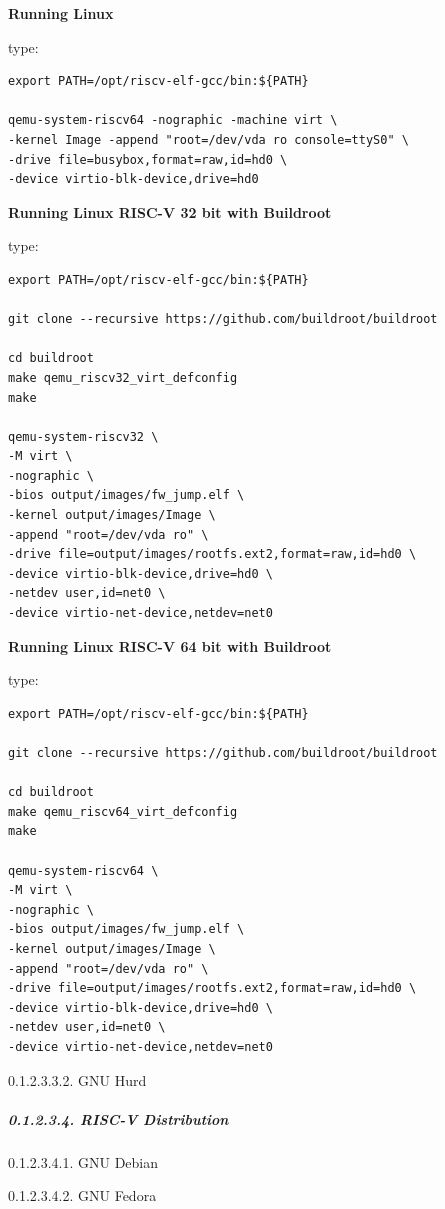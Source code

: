 \documentclass[
]{article}
\begin{document}
\textbf{Running Linux}

type:

\begin{verbatim}
export PATH=/opt/riscv-elf-gcc/bin:${PATH}

qemu-system-riscv64 -nographic -machine virt \
-kernel Image -append "root=/dev/vda ro console=ttyS0" \
-drive file=busybox,format=raw,id=hd0 \
-device virtio-blk-device,drive=hd0
\end{verbatim}

\textbf{Running Linux RISC-V 32 bit with Buildroot}

type:

\begin{verbatim}
export PATH=/opt/riscv-elf-gcc/bin:${PATH}

git clone --recursive https://github.com/buildroot/buildroot

cd buildroot
make qemu_riscv32_virt_defconfig
make

qemu-system-riscv32 \
-M virt \
-nographic \
-bios output/images/fw_jump.elf \
-kernel output/images/Image \
-append "root=/dev/vda ro" \
-drive file=output/images/rootfs.ext2,format=raw,id=hd0 \
-device virtio-blk-device,drive=hd0 \
-netdev user,id=net0 \
-device virtio-net-device,netdev=net0
\end{verbatim}

\textbf{Running Linux RISC-V 64 bit with Buildroot}

type:

\begin{verbatim}
export PATH=/opt/riscv-elf-gcc/bin:${PATH}

git clone --recursive https://github.com/buildroot/buildroot

cd buildroot
make qemu_riscv64_virt_defconfig
make

qemu-system-riscv64 \
-M virt \
-nographic \
-bios output/images/fw_jump.elf \
-kernel output/images/Image \
-append "root=/dev/vda ro" \
-drive file=output/images/rootfs.ext2,format=raw,id=hd0 \
-device virtio-blk-device,drive=hd0 \
-netdev user,id=net0 \
-device virtio-net-device,netdev=net0
\end{verbatim}

0.1.2.3.3.2. GNU Hurd

\hypertarget{risc-v-distribution-1}{%
\subparagraph{0.1.2.3.4. RISC-V
Distribution}\label{risc-v-distribution-1}}

0.1.2.3.4.1. GNU Debian

0.1.2.3.4.2. GNU Fedora
\end{document}
